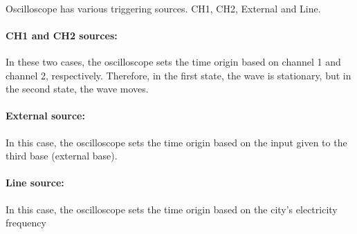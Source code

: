 \documentclass[11pt]{article}
\begin{document}
\begin{question}
{        \paragraph*{} Oscilloscope has various triggering sources. CH1, CH2, External and Line.

        \paragraph*{CH1 and CH2 sources:} In these two cases, the oscilloscope sets the time origin based on channel 1 and channel 2, respectively. Therefore, in the first state, the wave is stationary, but in the second state, the wave moves.

        \paragraph*{External source:} In this case, the oscilloscope sets the time origin based on the input given to the third base (external base).

        \paragraph*{Line source:} In this case, the oscilloscope sets the time origin based on the city's electricity frequency
    }

\end{question}

\end{document}
